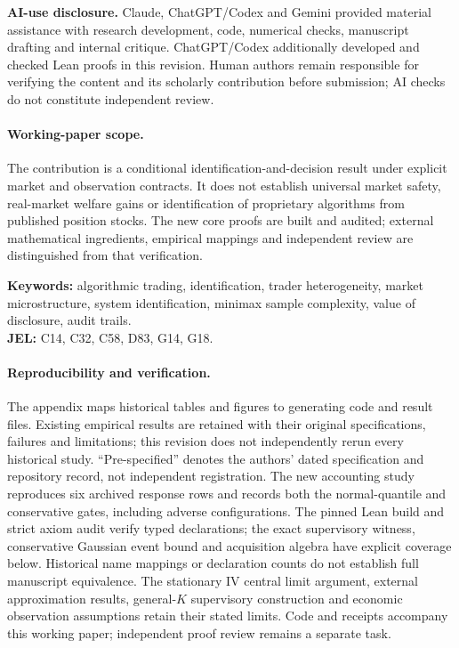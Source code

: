\documentclass[12pt]{article}
\theoremstyle{definition}
\theoremstyle{remark}
\begin{document}
\noindent\textbf{AI-use disclosure.} Claude, ChatGPT/Codex and Gemini provided material assistance with research development, code, numerical checks, manuscript drafting and internal critique. ChatGPT/Codex additionally developed and checked Lean proofs in this revision. Human authors remain responsible for verifying the content and its scholarly contribution before submission; AI checks do not constitute independent review.


\paragraph{Working-paper scope.} The contribution is a conditional identification-and-decision result under explicit market and observation contracts. It does not establish universal market safety, real-market welfare gains or identification of proprietary algorithms from published position stocks. The new core proofs are built and audited; external mathematical ingredients, empirical mappings and independent review are distinguished from that verification.


\noindent\textbf{Keywords:} algorithmic trading, identification, trader heterogeneity, market microstructure, system identification, minimax sample complexity, value of disclosure, audit trails.\\
\textbf{JEL:} C14, C32, C58, D83, G14, G18.

\paragraph{Reproducibility and verification.} The appendix maps historical tables and figures to generating code and result files. Existing empirical results are retained with their original specifications, failures and limitations; this revision does not independently rerun every historical study. ``Pre-specified'' denotes the authors' dated specification and repository record, not independent registration. The new accounting study reproduces six archived response rows and records both the normal-quantile and conservative gates, including adverse configurations. The pinned Lean build and strict axiom audit verify typed declarations; the exact supervisory witness, conservative Gaussian event bound and acquisition algebra have explicit coverage below. Historical name mappings or declaration counts do not establish full manuscript equivalence. The stationary IV central limit argument, external approximation results, general-$K$ supervisory construction and economic observation assumptions retain their stated limits. Code and receipts accompany this working paper; independent proof review remains a separate task.
\end{document}

